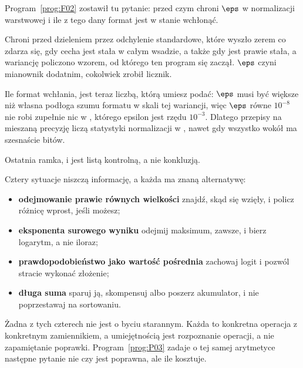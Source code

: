 \begin{fr}
\begin{aibox}
Program~\ref{prog:F02} zostawił tu pytanie: przed czym chroni $\eps$ w
normalizacji warstwowej i ile z tego dany format jest w stanie wchłonąć.

Chroni przed dzieleniem przez odchylenie standardowe, które wyszło zerem
\dash{} co zdarza się, gdy cecha jest stała w całym wsadzie, a także gdy jest
prawie stała, a wariancję policzono wzorem, od którego ten program się zaczął.
$\eps$ czyni mianownik dodatnim, cokolwiek zrobił licznik.

Ile format wchłania, jest teraz liczbą, którą umiesz podać: $\eps$ musi być
większe niż własna podłoga szumu formatu w skali tej wariancji, więc $\eps$
równe $10^{-8}$ nie robi zupełnie nic w , którego epsilon jest rzędu
$10^{-3}$. Dlatego przepisy na mieszaną precyzję liczą statystyki normalizacji
w , nawet gdy wszystko wokół ma szesnaście bitów.
\end{aibox}
\end{fr}

\begin{fr}
Ostatnia ramka, i jest listą kontrolną, a nie konkluzją.

Cztery sytuacje niszczą informację, a każda ma znaną alternatywę:

\begin{itemize}
\item \textbf{odejmowanie prawie równych wielkości} \dash{} znajdź, skąd się
  wzięły, i policz różnicę wprost, jeśli możesz;
\item \textbf{eksponenta surowego wyniku} \dash{} odejmij maksimum, zawsze, i
  bierz logarytm, a nie iloraz;
\item \textbf{prawdopodobieństwo jako wartość pośrednia} \dash{} zachowaj logit
  i pozwól stracie wykonać złożenie;
\item \textbf{długa suma} \dash{} sparuj ją, skompensuj albo poszerz
  akumulator, i nie poprzestawaj na sortowaniu.
\end{itemize}

Żadna z tych czterech nie jest o byciu starannym. Każda to konkretna operacja z
konkretnym zamiennikiem, a umiejętnością jest rozpoznanie operacji, a nie
zapamiętanie poprawki. Program~\ref{prog:P03} zadaje o tej samej arytmetyce
następne pytanie \dash{} nie czy jest poprawna, ale ile kosztuje.
\end{fr}

